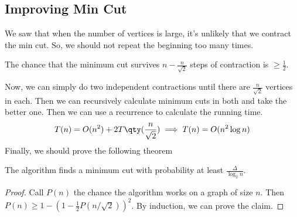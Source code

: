 \subsection{Improving Min Cut}
We saw that when the number of vertices is large, it's unlikely that we contract the min cut.
So, we should not repeat the beginning too many times.
\begin{theorem}
    The chance that the minimum cut survives $n - \frac{n}{\sqrt{2}}$ steps of contraction
    is $\ge \frac{1}{2}$. 
\end{theorem}
Now, we can simply do two independent contractions until there are $\frac{n}{\sqrt{2}}$ vertices in each.
Then we can recursively calculate minimum cuts in both and take the better one. Then
we can use a recurrence to calculate the running time.
\[ T(n) = O(n^2) + 2T\qty(\frac{n}{\sqrt{2}}) \implies T(n) = O(n^2 \log n) \]
Finally, we should prove the following theorem
\begin{theorem}
    The algorithm finds a minimum cut with probability at least $\frac{\Delta}{\log_2 n}$.

    \begin{proof}
        Call $P(n)$ the chance the algorithm works on a graph of size $n$. Then $P(n) \ge 1 - (1 - \frac{1}{2} P(n/\sqrt{2}))^2$.
        By induction, we can prove the claim.
    \end{proof}
\end{theorem}